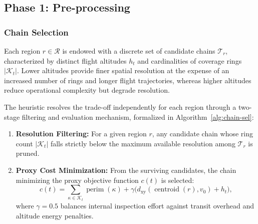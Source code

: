 \documentclass[12pt]{elsarticle}
\begin{document}
\subsection{Phase 1: Pre-processing}

\subsubsection{Chain Selection}\label{sec:chain-sel}

Each region $r \in \mathcal{R}$ is endowed with a discrete set of candidate chains $\mathcal{T}_r$, characterized by distinct flight altitudes $h_t$ and cardinalities of coverage rings $|\mathcal{K}_t|$. Lower altitudes provide finer spatial resolution at the expense of an increased number of rings and longer flight trajectories, whereas higher altitudes reduce operational complexity but degrade resolution.

The heuristic resolves the trade-off independently for each region through a two-stage filtering and evaluation mechanism, formalized in Algorithm~\ref{alg:chain-sel}:
\begin{enumerate}
	\item \textbf{Resolution Filtering:} For a given region $r$, any candidate chain whose ring count $|\mathcal{K}_t|$ falls strictly below the maximum available resolution among $\mathcal{T}_r$ is pruned.
	\item \textbf{Proxy Cost Minimization:} From the surviving candidates, the chain minimizing the proxy objective function $c(t)$ is selected:
	\[
	c(t) = \sum_{\kappa \in \mathcal{K}_t} \operatorname{perim}(\kappa) + \gamma \bigl( d_{\text{xy}}(\operatorname{centroid}(r), v_0) + h_t \bigr),
	\]
	where $\gamma = 0.5$ balances internal inspection effort against transit overhead and altitude energy penalties.
\end{enumerate}

\begin{algorithm}[t]
	\SetAlgoLined
	\BlankLine
	\caption{Chain selection per region.}
	\label{alg:chain-sel}
\end{algorithm}
\end{document}
